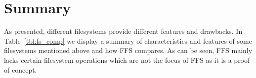 
\section{Summary} %


As presented, different filesystems provide different features and drawbacks. 
In Table~\ref{tbl:fs_comp} we display a summary of characteristics and features 
of some filesystems mentioned above and how \gls{FFS} compares. As can be seen, \gls{FFS} 
mainly lacks certain filesystem operations which are not the focus of
\gls{FFS} as it is a proof of concept. 

			
			
			

